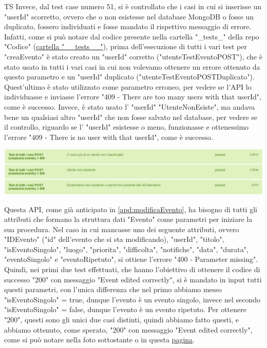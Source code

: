 \begin{listaPersonale}{TS}
                Invece, dal test case numero 51, si è controllato che i casi in cui si inserisse un "userId" scorretto, ovvero che o non esistesse nel database MongoDB o fosse un duplicato, fossero individuati e fosse mandato il rispettivo messaggio di errore. Infatti, come si può notare dal codice presente nella cartella "\_tests\_" della repo "Codice" (\href{https://github.com/Life-planner/Codice/tree/main/__tests__}{cartella "\_\_tests\_\_"}), prima dell'esecuzione di tutti i vari test per "creaEvento" è stato creato un "userId" corretto ("utenteTestEventoPOST"), che è stato usato in tutti i vari casi in cui non volevamo ottenere un errore ottenuto da questo parametro e un "userId" duplicato ("utenteTestEventoPOSTDuplicato"). Quest'ultimo è stato utilizzato come parametro erroneo, per vedere se l'API lo individuasse e inviasse l'errore "409 - There are too many users with that userId", come è successo. Invece, è stato usato l' "userId" "UtenteNonEsiste", ma andava bene un qualsiasi altro "userId" che non fosse salvato nel database, per vedere se il controllo, riguardo se l' "userId" esistesse o meno, funzionasse e ottenessimo l'errore "409 - There is no user with that userId", come è successo.
                \begin{center}
                        \includegraphics[width=1\textwidth, height=0.12\textheight]{img/png/tests/EventoPost/409_PostEvento.png}
                \end{center}
                Questa API, come già anticipato in \ref{apd:modificaEvento}, ha bisogno di tutti gli attributi che formano la struttura dati "Evento" come parametri per iniziare la sua procedura. Nel caso in cui mancasse uno dei seguente attributi, ovvero "IDEvento" ("id" dell'evento che si sta modificando), "userId", "titolo", "isEventoSingolo", "luogo", "priorita", "difficolta", "notifiche", "data", "durata", "eventoSingolo" e "eventoRipetuto", si ottiene l'errore "400 - Parameter missing". Quindi, nei primi due test effettuati, che hanno l'obiettivo di ottenere il codice di successo "200" con messaggio "Event edited correctly", si è mandato in input tutti questi parametri, con l'unica differenza che nel primo abbiamo messo "isEventoSingolo" = true, dunque l'evento è un evento singolo, invece nel secondo "isEventoSingolo" = false, dunque l'evento è un evento ripetuto. Per ottenere "200", questi sono gli unici due casi distinti, quindi abbiamo fatto questi, e abbiamo ottenuto, come sperato, "200" con messaggio "Event edited correctly", come si può notare nella foto sottostante o in questa  \href{https://plan-it.it/test-report.html} {pagina}.

\end{listaPersonale}
